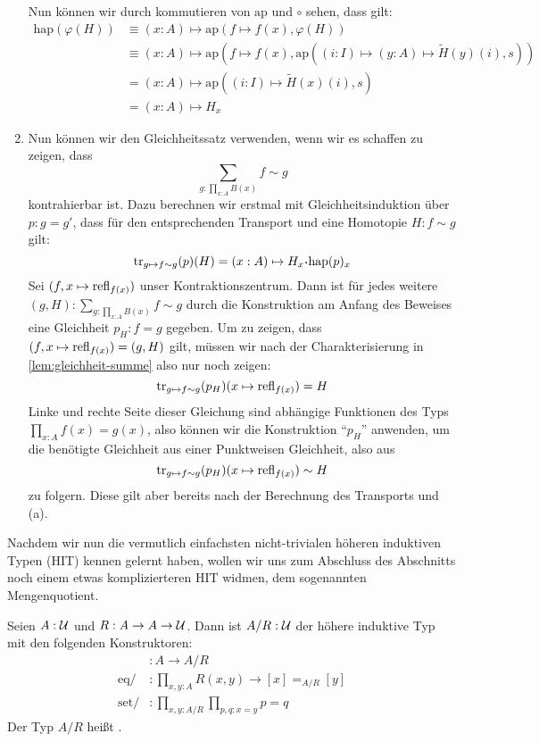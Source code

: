\begin{beweis}
\begin{enumerate}
  Nun können wir durch kommutieren von $\mathrm{ap}$ und $\circ$ sehen, dass gilt:
  \begin{align*}
    \mathrm{hap}(\varphi(H))&\equiv (x:A)\mapsto\mathrm{ap}(f\mapsto f(x),\varphi(H)) \\
                            &\equiv (x:A)\mapsto\mathrm{ap}(f\mapsto f(x),\mathrm{ap}((i:I)\mapsto (y:A)\mapsto \tilde{H}(y)(i),s)) \\
                            &= (x:A)\mapsto \mathrm{ap}((i:I)\mapsto \tilde{H}(x)(i),s) \\
                            &= (x:A)\mapsto H_x
  \end{align*}
\item Nun können wir den Gleichheitssatz verwenden, wenn wir es schaffen zu zeigen, dass
  \[
    \sum_{g:\prod_{x:A}B(x)}f\sim g
  \]
  kontrahierbar ist. Dazu berechnen wir erstmal mit Gleichheitsinduktion über $p:g=g'$,
  dass für den entsprechenden Transport und eine Homotopie $H:f\sim g$ gilt:
  \[
    \transp_{g\mapsto f\sim g}(p)(H)=(x:A)\mapsto H_x\kon \mathrm{hap}(p)_x
  \]
  Sei $(f,x\mapsto \mathrm{refl}_{f(x)})$ unser Kontraktionszentrum.
  Dann ist für jedes weitere $(g,H):\sum_{g:\prod_{x:A}B(x)}f\sim g$ durch die Konstruktion am Anfang des Beweises eine Gleichheit $p_H:f=g$ gegeben.
  Um zu zeigen, dass $(f,x\mapsto \mathrm{refl}_{f(x)})=(g,H)$ gilt, müssen wir nach der Charakterisierung in \cref{lem:gleichheit-summe} also nur noch zeigen:
  \[
    \mathrm{tr}_{g\mapsto f\sim g}(p_H)(x\mapsto\mathrm{refl}_{f(x)})=H
  \]
  Linke und rechte Seite dieser Gleichung sind abhängige Funktionen des Typs $\prod_{x:A}f(x)=g(x)$,
  also können wir die Konstruktion ``$p_H$'' anwenden, um die benötigte Gleichheit aus einer Punktweisen Gleichheit, also aus 
  \[
    \mathrm{tr}_{g\mapsto f\sim g}(p_H)(x\mapsto\mathrm{refl}_{f(x)})\sim H
  \]
  zu folgern. Diese gilt aber bereits nach der Berechnung des Transports und (a).
\end{enumerate}
\end{beweis}

Nachdem wir nun die vermutlich einfachsten nicht-trivialen höheren induktiven Typen (HIT) kennen gelernt haben,
wollen wir uns zum Abschluss des Abschnitts noch einem etwas komplizierteren HIT widmen,
dem sogenannten Mengenquotient.

\begin{regeln}
  Seien $A:\mathcal{U}$ und $R:A\to A\to \mathcal{U}$. Dann ist $A / R:\mathcal{U}$ der höhere induktive Typ mit den folgenden Konstruktoren:
  \begin{align*}
    [\_]&:A\to A / R \\
    \mathrm{eq /}&:\prod_{x,y:A}R(x,y)\to [x] =_{A / R} [y] \\
    \mathrm{set /}&:\prod_{x,y:A / R}\prod_{p,q : x=y}p=q
  \end{align*}
  Der Typ $A / R$ heißt .
\end{regeln}

